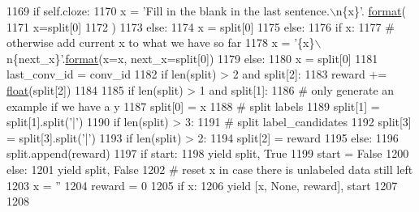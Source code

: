 \begin{DoxyCode}
1169                     \textcolor{keywordflow}{if} self.cloze:
1170                         x = \textcolor{stringliteral}{'Fill in the blank in the last sentence.\(\backslash\)n\{x\}'}.
      \hyperlink{namespaceparlai_1_1chat__service_1_1services_1_1messenger_1_1shared__utils_a32e2e2022b824fbaf80c747160b52a76}{format}(
1171                             x=split[0]
1172                         )
1173                     \textcolor{keywordflow}{else}:
1174                         x = split[0]
1175                 \textcolor{keywordflow}{else}:
1176                     \textcolor{keywordflow}{if} x:
1177                         \textcolor{comment}{# otherwise add current x to what we have so far}
1178                         x = \textcolor{stringliteral}{'\{x\}\(\backslash\)n\{next\_x\}'}.\hyperlink{namespaceparlai_1_1chat__service_1_1services_1_1messenger_1_1shared__utils_a32e2e2022b824fbaf80c747160b52a76}{format}(x=x, next\_x=split[0])
1179                     \textcolor{keywordflow}{else}:
1180                         x = split[0]
1181                 last\_conv\_id = conv\_id
1182                 \textcolor{keywordflow}{if} len(split) > 2 \textcolor{keywordflow}{and} split[2]:
1183                     reward += \hyperlink{namespaceprojects_1_1controllable__dialogue_1_1make__control__dataset_aa2b7207688c641dbc094ab44eca27113}{float}(split[2])
1184 
1185                 \textcolor{keywordflow}{if} len(split) > 1 \textcolor{keywordflow}{and} split[1]:
1186                     \textcolor{comment}{# only generate an example if we have a y}
1187                     split[0] = x
1188                     \textcolor{comment}{# split labels}
1189                     split[1] = split[1].split(\textcolor{stringliteral}{'|'})
1190                     \textcolor{keywordflow}{if} len(split) > 3:
1191                         \textcolor{comment}{# split label\_candidates}
1192                         split[3] = split[3].split(\textcolor{stringliteral}{'|'})
1193                     \textcolor{keywordflow}{if} len(split) > 2:
1194                         split[2] = reward
1195                     \textcolor{keywordflow}{else}:
1196                         split.append(reward)
1197                     \textcolor{keywordflow}{if} start:
1198                         \textcolor{keywordflow}{yield} split, \textcolor{keyword}{True}
1199                         start = \textcolor{keyword}{False}
1200                     \textcolor{keywordflow}{else}:
1201                         \textcolor{keywordflow}{yield} split, \textcolor{keyword}{False}
1202                     \textcolor{comment}{# reset x in case there is unlabeled data still left}
1203                     x = \textcolor{stringliteral}{''}
1204                     reward = 0
1205             \textcolor{keywordflow}{if} x:
1206                 \textcolor{keywordflow}{yield} [x, \textcolor{keywordtype}{None}, reward], start
1207 
1208 
\end{DoxyCode}
